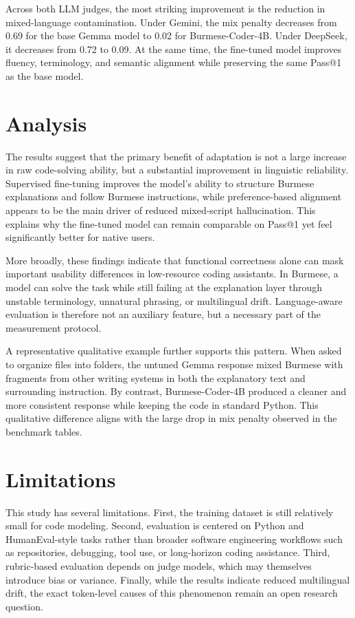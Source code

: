 \documentclass[11pt]{article}
\begin{document}
Across both LLM judges, the most striking improvement is the reduction in mixed-language contamination. Under Gemini, the mix penalty decreases from 0.69 for the base Gemma model to 0.02 for Burmese-Coder-4B. Under DeepSeek, it decreases from 0.72 to 0.09. At the same time, the fine-tuned model improves fluency, terminology, and semantic alignment while preserving the same Pass@1 as the base model.

\section{Analysis}
The results suggest that the primary benefit of adaptation is not a large increase in raw code-solving ability, but a substantial improvement in linguistic reliability. Supervised fine-tuning improves the model's ability to structure Burmese explanations and follow Burmese instructions, while preference-based alignment appears to be the main driver of reduced mixed-script hallucination. This explains why the fine-tuned model can remain comparable on Pass@1 yet feel significantly better for native users.

More broadly, these findings indicate that functional correctness alone can mask important usability differences in low-resource coding assistants. In Burmese, a model can solve the task while still failing at the explanation layer through unstable terminology, unnatural phrasing, or multilingual drift. Language-aware evaluation is therefore not an auxiliary feature, but a necessary part of the measurement protocol.

A representative qualitative example further supports this pattern. When asked to organize files into folders, the untuned Gemma response mixed Burmese with fragments from other writing systems in both the explanatory text and surrounding instruction. By contrast, Burmese-Coder-4B produced a cleaner and more consistent response while keeping the code in standard Python. This qualitative difference aligns with the large drop in mix penalty observed in the benchmark tables.

\section{Limitations}
This study has several limitations. First, the training dataset is still relatively small for code modeling. Second, evaluation is centered on Python and HumanEval-style tasks rather than broader software engineering workflows such as repositories, debugging, tool use, or long-horizon coding assistance. Third, rubric-based evaluation depends on judge models, which may themselves introduce bias or variance. Finally, while the results indicate reduced multilingual drift, the exact token-level causes of this phenomenon remain an open research question.
\end{document}

